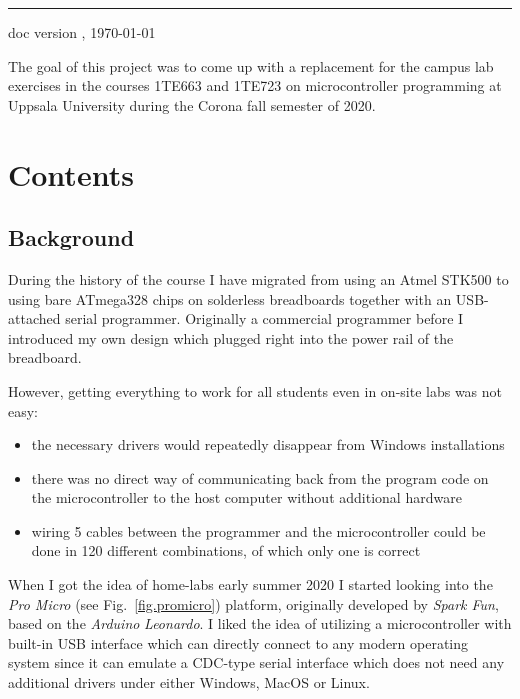 \noindent\rule{17cm}{0.5mm}
\begin{flushright}
 doc version \thevernum,  \today
\end{flushright}

The goal of this project was to come up with a replacement for the campus lab exercises in the courses
1TE663 and 1TE723 on
microcontroller programming at Uppsala University during the Corona fall semester of 2020.

\section*{Contents}
\tableofcontents

\clearpage

\begin{multicols}{2}
\section{Background}
During the history of the course I have migrated from using an Atmel STK500 to using bare
ATmega328 chips on solderless breadboards together with an USB-attached serial programmer.
Originally a commercial programmer before I introduced my own design which plugged right
into the power rail of the breadboard.

However, getting everything to work for all students even in on-site labs was not easy:
\begin{itemize}\tightlist
  \item the necessary drivers would repeatedly disappear from Windows installations
  \item there was no
direct way of communicating back from the program code on the microcontroller to the host
computer without additional hardware
  \item wiring 5 cables between the programmer and the microcontroller could be done in
  120 different combinations, of which only one is correct
\end{itemize}

When I got the idea of home-labs early summer 2020 I started looking into the \emph{Pro Micro} (see Fig.~\ref{fig.promicro})
platform, originally developed by \emph{Spark Fun}, based on the \emph{Arduino} \emph{Leonardo}.
I liked the idea of utilizing a microcontroller
with built-in USB interface which can directly connect to any modern operating system
since it can emulate a CDC-type serial interface which does not need any additional drivers under
either Windows, MacOS or Linux.


\end{multicols}
